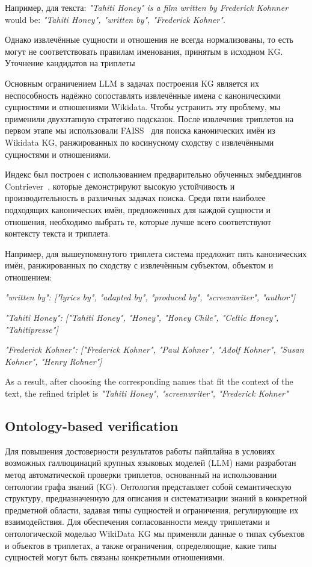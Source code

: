 Например, для текста:
\textit{"Tahiti Honey" is a film written by Frederick Kohnner} would be:
\textit{"Tahiti Honey", "written by", "Frederick Kohner"}.

Однако извлечённые сущности и отношения не всегда нормализованы, то есть могут не соответствовать правилам именования, принятым в исходном KG.
Уточнение кандидатов на триплеты

\label{sec:triplet-retrieval}
Основным ограничением LLM в задачах построения KG является их неспособность надёжно сопоставлять извлечённые имена с каноническими сущностями и отношениями Wikidata. Чтобы устранить эту проблему, мы применили двухэтапную стратегию подсказок. После извлечения триплетов на первом этапе мы использовали FAISS~\cite{faiss} для поиска канонических имён из Wikidata KG, ранжированных по косинусному сходству с извлечёнными сущностями и отношениями.

Индекс был построен с использованием предварительно обученных эмбеддингов Contriever~\cite{contriever}, которые демонстрируют высокую устойчивость и производительность в различных задачах поиска. Среди пяти наиболее подходящих канонических имён, предложенных для каждой сущности и отношения, необходимо выбрать те, которые лучше всего соответствуют контексту текста и триплета.

Например, для вышеупомянутого триплета система предложит пять канонических имён, ранжированных по сходству с извлечённым субъектом, объектом и отношением: \


\textit{"written by": ["lyrics by", "adapted by", "produced by", "screenwriter", "author"]}

\textit{"Tahiti Honey": ["Tahiti Honey", "Honey", 
"Honey Chile", "Celtic Honey", "Tahitipresse"]}

\textit{"Frederick Kohner": ["Frederick Kohner",
"Paul Kohner", "Adolf Kohner", "Susan Kohner", "Henry Rohner"]}

As a result, after choosing the corresponding names that fit the context of the text, the refined triplet is
\textit{"Tahiti Honey", "screenwriter", "Frederick Kohner"}

\subsection{Ontology-based verification}
\label{sec:filtration}
Для повышения достоверности результатов работы пайплайна в условиях возможных галлюцинаций крупных языковых моделей (LLM) нами разработан метод автоматической проверки триплетов, основанный на использовании онтологии графа знаний (KG). Онтология представляет собой семантическую структуру, предназначенную для описания и систематизации знаний в конкретной предметной области, задавая типы сущностей и ограничения, регулирующие их взаимодействия. Для обеспечения согласованности между триплетами и онтологической моделью WikiData KG мы применяли данные о типах субъектов и объектов в триплетах, а также ограничения, определяющие, какие типы сущностей могут быть связаны конкретными отношениями.

